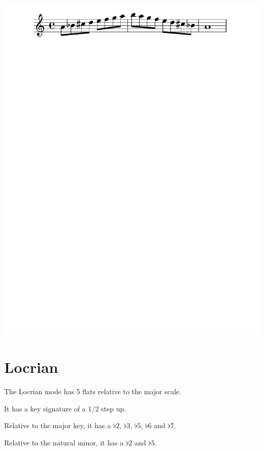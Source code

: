 \documentclass[11pt]{article}
\begin{document}
\begin{center}
\includegraphics[width=.9\linewidth]{a_phrygian_dominant.pdf}
\end{center}

\section*{Locrian}
\label{sec:org341fd75}

The Locrian mode has 5 flats relative to the major scale.

It has a key signature of a 1/2 step up.

Relative to the major key, it has a \(\flat{2}\), \(\flat{3}\), \(\flat{5}\), \(\flat{6}\)  and \(\flat{7}\).

Relative to the natural minor, it has a \(\flat{2}\) and \(\flat{5}\).
\end{document}
